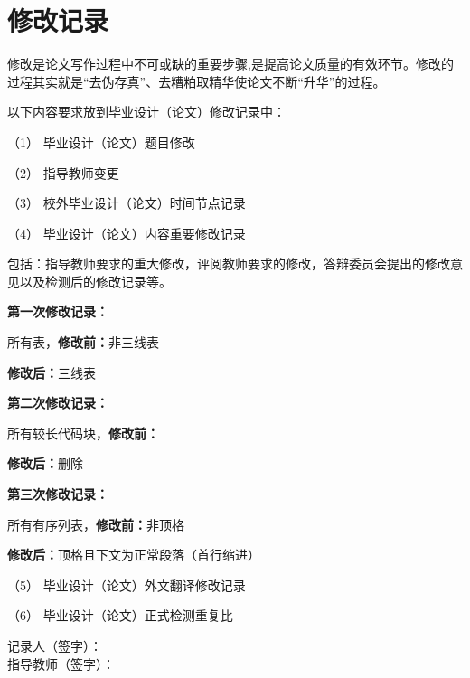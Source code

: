 
\chapter*{\hfill 修改记录 \hfill}
\linespread{1.25}
修改是论文写作过程中不可或缺的重要步骤,是提高论文质量的有效环节。修改的过程其实就是“去伪存真”、去糟粕取精华使论文不断“升华”的过程。

以下内容要求放到毕业设计（论文）修改记录中：

（1） 毕业设计（论文）题目修改




（2） 指导教师变更



（3） 校外毕业设计（论文）时间节点记录




（4） 毕业设计（论文）内容重要修改记录

包括：指导教师要求的重大修改，评阅教师要求的修改，答辩委员会提出的修改意见以及检测后的修改记录等。

{\textbf {第一次修改记录：}}

所有表，{\textbf{修改前：}}非三线表

{\textbf{修改后：}}三线表

{\textbf {第二次修改记录：}}

所有较长代码块，{\textbf{修改前：}}

{\textbf{修改后：}}删除

{\textbf {第三次修改记录：}}

所有有序列表，{\textbf{修改前：}}非顶格

{\textbf{修改后：}}顶格且下文为正常段落（首行缩进）

（5） 毕业设计（论文）外文翻译修改记录

（6） 毕业设计（论文）正式检测重复比

\hspace*{18em}记录人（签字）：\\
\hspace*{19em}指导教师（签字）：